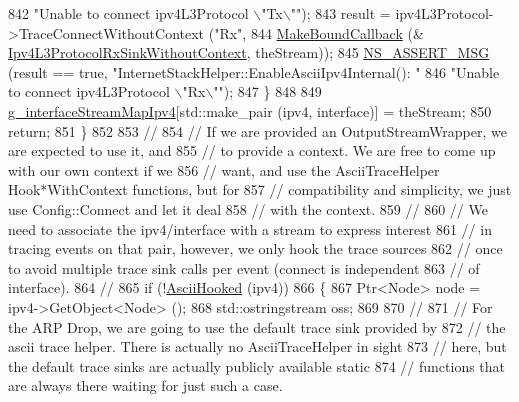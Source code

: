 \begin{DoxyCode}
842                          \textcolor{stringliteral}{"Unable to connect ipv4L3Protocol \(\backslash\)"Tx\(\backslash\)""});
843           result = ipv4L3Protocol->TraceConnectWithoutContext (\textcolor{stringliteral}{"Rx"}, 
844                                                                \hyperlink{group__makeboundcallback_ga1725d6362e6065faa0709f7c93f8d770}{MakeBoundCallback} (&
      \hyperlink{namespacens3_ab7f559cb75bca820ec86b2be4523b8bf}{Ipv4L3ProtocolRxSinkWithoutContext}, theStream));
845           \hyperlink{assert_8h_aff5ece9066c74e681e74999856f08539}{NS\_ASSERT\_MSG} (result == \textcolor{keyword}{true}, \textcolor{stringliteral}{"InternetStackHelper::EnableAsciiIpv4Internal():  "}
846                          \textcolor{stringliteral}{"Unable to connect ipv4L3Protocol \(\backslash\)"Rx\(\backslash\)""});
847         \}
848 
849       \hyperlink{namespacens3_ad7720e08dcb21331d85c00128abc175a}{g\_interfaceStreamMapIpv4}[std::make\_pair (ipv4, interface)] = theStream;
850       \textcolor{keywordflow}{return};
851     \}
852 
853   \textcolor{comment}{//}
854   \textcolor{comment}{// If we are provided an OutputStreamWrapper, we are expected to use it, and}
855   \textcolor{comment}{// to provide a context.  We are free to come up with our own context if we}
856   \textcolor{comment}{// want, and use the AsciiTraceHelper Hook*WithContext functions, but for }
857   \textcolor{comment}{// compatibility and simplicity, we just use Config::Connect and let it deal}
858   \textcolor{comment}{// with the context.}
859   \textcolor{comment}{//}
860   \textcolor{comment}{// We need to associate the ipv4/interface with a stream to express interest}
861   \textcolor{comment}{// in tracing events on that pair, however, we only hook the trace sources }
862   \textcolor{comment}{// once to avoid multiple trace sink calls per event (connect is independent}
863   \textcolor{comment}{// of interface).}
864   \textcolor{comment}{//}
865   \textcolor{keywordflow}{if} (!\hyperlink{classns3_1_1InternetStackHelper_a4b26d61d78933a884a03fbda4ec6eddc}{AsciiHooked} (ipv4))
866     \{
867       Ptr<Node> node = ipv4->GetObject<Node> ();
868       std::ostringstream oss;
869 
870       \textcolor{comment}{//}
871       \textcolor{comment}{// For the ARP Drop, we are going to use the default trace sink provided by }
872       \textcolor{comment}{// the ascii trace helper.  There is actually no AsciiTraceHelper in sight }
873       \textcolor{comment}{// here, but the default trace sinks are actually publicly available static }
874       \textcolor{comment}{// functions that are always there waiting for just such a case.}

\end{DoxyCode}
